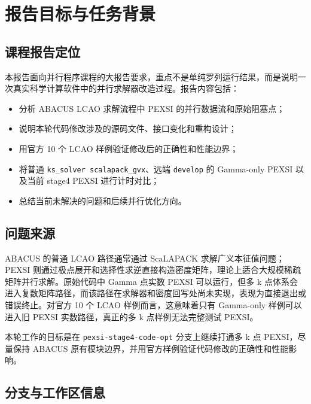 \documentclass[a4paper,11pt]{article}
\newcommand{\code}[1]{\texttt{#1}}
\begin{document}
\tableofcontents
\newpage

\section{报告目标与任务背景}

\subsection{课程报告定位}

本报告面向并行程序课程的大报告要求，重点不是单纯罗列运行结果，而是说明一次真实科学计算软件中的并行求解器改造过程。报告内容包括：

\begin{itemize}
    \item 分析 ABACUS LCAO 求解流程中 PEXSI 的并行数据流和原始阻塞点；
    \item 说明本轮代码修改涉及的源码文件、接口变化和重构设计；
    \item 用官方 10 个 LCAO 样例验证修改后的正确性和性能边界；
    \item 将普通 \code{ks\_solver scalapack\_gvx}、远端 \code{develop} 的 Gamma-only PEXSI 以及当前 stage4 PEXSI 进行计时对比；
    \item 总结当前未解决的问题和后续并行优化方向。
\end{itemize}

\subsection{问题来源}

ABACUS 的普通 LCAO 路径通常通过 ScaLAPACK 求解广义本征值问题；PEXSI 则通过极点展开和选择性求逆直接构造密度矩阵，理论上适合大规模稀疏矩阵并行求解。原始代码中 Gamma 点实数 PEXSI 可以运行，但多 k 点体系会进入复数矩阵路径，而该路径在求解器和密度回写处尚未实现，表现为直接退出或错误终止。对官方 10 个 LCAO 样例而言，这意味着只有 Gamma-only 样例可以进入旧 PEXSI 实数路径，真正的多 k 点样例无法完整测试 PEXSI。

本轮工作的目标是在 \code{pexsi-stage4-code-opt} 分支上继续打通多 k 点 PEXSI，尽量保持 ABACUS 原有模块边界，并用官方样例验证代码修改的正确性和性能影响。

\subsection{分支与工作区信息}
\end{document}
